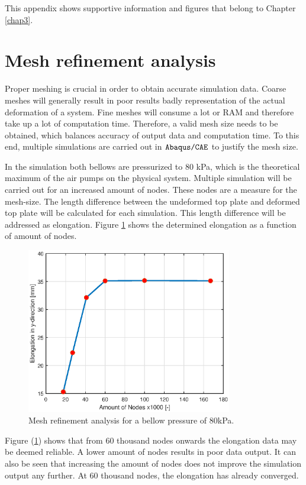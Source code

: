 \label{app:chap3}

This appendix shows supportive information and figures that belong to Chapter \ref{chap3}.



\section{Mesh refinement analysis}

Proper meshing is crucial in order to obtain accurate simulation data. Coarse meshes will generally result in poor results badly representation of the actual deformation of a system. Fine meshes will consume a lot or RAM and therefore take up a lot of computation time. Therefore, a valid mesh size needs to be obtained, which balances accuracy of output data and computation time. To this end, multiple simulations are carried out in $\verb+Abaqus/CAE+$ to justify the mesh size.

In the simulation both bellows are pressurized to $80$ kPa, which is the theoretical maximum of the air pumps on the physical system. Multiple simulation will be carried out for an increased amount of nodes. These nodes are a measure for the mesh-size. The length difference between the undeformed top plate and deformed top plate will be calculated for each simulation. This length difference will be addressed as elongation. Figure \ref{fig3:meshrefinement} shows the determined elongation as a function of amount of nodes.

\begin{figure}[H]
    \centering
    \includegraphics[width = 0.8\textwidth]{Figures/Chapter2/MeshRefinement.eps}
    \caption{Mesh refinement analysis for a bellow pressure of $80$kPa.}
    \label{fig3:meshrefinement}
\end{figure}


Figure (\ref{fig3:meshrefinement}) shows that from 60 thousand nodes onwards the elongation data may be deemed reliable. A lower amount of nodes results in poor data output. It can also be seen that increasing the amount of nodes does not improve the simulation output any further. At 60 thousand nodes, the elongation has already converged.

